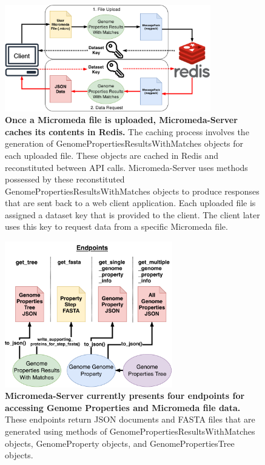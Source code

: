 \begin{figure}[!ht]
  \centering
	\includegraphics[width=0.80\textwidth]{media/Micromeda-Server-Workflow.pdf}
	 \caption[Once a Micromeda file is uploaded, Micromeda-Server caches its contents in Redis.]{\textbf{Once a Micromeda file is uploaded, Micromeda-Server caches its contents in Redis.} The caching process involves the generation of GenomePropertiesResultsWithMatches objects for each uploaded file. These objects are cached in Redis and reconstituted between API calls. Micromeda-Server uses methods possessed by these reconstituted GenomePropertiesResultsWithMatches objects to produce responses that are sent back to a web client application. Each uploaded file is assigned a dataset key that is provided to the client. The client later uses this key to request data from a specific Micromeda file.}
	 \label{fig:micromeda-server-workflow}
\end{figure}

\begin{figure}[!ht]
  \centering
	\includegraphics[width=0.65\textwidth]{media/Micromeda-Endpoints.pdf}
	 \caption[Micromeda-Server currently presents four endpoints for accessing Genome Properties and Micromeda file data.]{\textbf{Micromeda-Server currently presents four endpoints for accessing Genome Properties and Micromeda file data.} These endpoints return JSON documents and FASTA files that are generated using methods of GenomePropertiesResultsWithMatches objects, GenomeProperty objects, and GenomePropertiesTree objects.}
	 \label{fig:micromeda-endpoints}
\end{figure}

